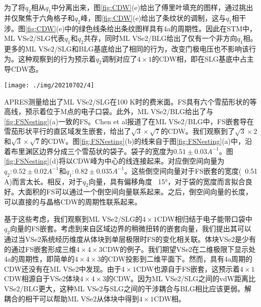 \documentclass[reprint, aps, prb, showkeys]{revtex4-2}
\begin{document}
为了将$q_2$相从$q_1$中分离出来，图\ref{fig:CDW}(e)给出了傅里叶填充的图样，通过挑出并仅聚焦于六角格子和$q_2$峰，图\ref{fig:CDW}(e)给出了条纹状的调制，这与$q_1$相干涉。图\ref{fig:CDW}(e)中的绿色线条给出条纹图样具有4a的周期性。因此在STM中，ML VSe2/SLG代表$q_1$和$q_2$共存，同时ML VSe2/BLG给出了仅有一个非方向$q_1$相。更多的ML VSe2/SLG和BLG基底给出了相同的行为，改变门极电压也不影响该行为。这种观察到的行为预示着$q_2$调制对应了$4 \times 1$的CDW相，即在SLG基底中占主导CDW态。
\begin{figure*}[b]
    \texttt{[image: ./img/20210702/4]}
    \caption{\label{fig:FSNesting} 
    Fermi surface nesting in ML VSe2/SLG.
    }
\end{figure*}
APRES测量给出了ML VSe2/SLG在100 K时的费米面。FS具有六个雪茄形状的等高线，预示着位于M点的电子口袋。此外，ML VSe2/BLG给出了与\ref{fig:FSNesting}(a)一致的FS。Chen et al报道了在ML VSe2/BLG中，FS嵌套导在雪茄形状平行的直区域发生嵌套，给出了$\sqrt{3} \times \sqrt{7}$的CDW。我们观察到了$\sqrt{3} \times 2$和$\sqrt{3} \times \sqrt{7}$的CDW。图\ref{fig:FSNesting}(b)的线来自于图\ref{fig:FSNesting}(a)中，沿着布里渊区边界分成三个雪茄状的袋子。袋子的宽度为$0.51 \pm 0.03 A^{{-1}}$。图\ref{fig:FSNesting}(d)将以CDW峰为中心的线连接起来。对应倒空间向量为$q_2: 0.52 \pm 0.02 A^{-1}$和$q_1: 0.82 \pm 0.035 A^{-1}$。这些倒空间向量对于FS嵌套的宽度(~0.51 A)而言太长。相反，对于$q_2$向量，具有偏移角度~ 15°，对于袋的宽度而言拟合良好。大面积的FS可以通过一个倒空间向量联系起来。之后，倒空间向量的长度，可以直接的与晶格CDW的周期性联系起来。

基于这些考虑，我们观察到ML VSe2/SLG的$4 \times 1$CDW相归结于电子能带口袋中$q_2$向量的FS嵌套。考虑到来自区域边界的稍微扭转的嵌套向量，我们提出其可以通过当VSe2系统经历维度从体块到单层极限时FS的变化相关联。体块VSe2是少有的通过FS嵌套形成三维$4 \times 4 \times 3$CDW的例子。我们期望VSe2在二维极限下显示处4a的周期性，即简单的$4 \times 4 \times 3$的CDW投影到二维平面下。然而，具有4a周期的CDW还没有在ML VSe2中发现。由于$4 \times 1$CDW也源自于FS嵌套，这预示着$4 \times 1$CDW相源自于VSe2体块$4 \times 4 \times 3$的CDW。因为ML VSe2/SLG之间的vdW距离比VSe2/BLG更大，这种ML VSe2与SLG之间的干涉耦合与BLG相比应该更弱。解耦合的相干可以帮助ML VSe2从体块中得到$4 \times 1$CDW相。
\end{document}
